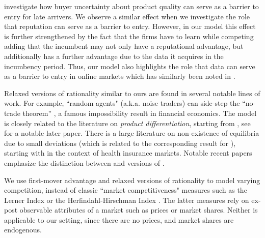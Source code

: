 \cite{schmalensee1982product, bagwell1990informational} investigate how buyer uncertainty about product quality can serve as a barrier to entry for late arrivers. We observe a similar effect when we investigate the role that reputation can serve as a barrier to entry. However, in our model this effect is further strengthened by the fact that the firms have to learn while competing adding that the incumbent may not only have a reputational advantage, but additionally has a further advantage due to the data it acquires in the incumbency period. Thus, our model also highlights the role that data can serve as a barrier to entry in online markets which has similarly been noted in \cite{de2020data}. 


Relaxed versions of rationality similar to ours are found in several notable lines of work. For example, ``random agents" (a.k.a. noise traders) can side-step the ``no-trade theorem'' \citep{Milgrom-Stokey-82}, a famous impossibility result in financial economics. The \SoftMaxRandom model is closely related to the literature on \emph{product differentiation}, starting from \cite{Hotelling-29}, see \cite{Perloff-Salop-85} for a notable later paper. There is a large literature on non-existence of equilibria due to small deviations   (which is related to the corresponding result for \HardMaxRandom), starting with \cite{Rothschild-Stiglitz-76} in the context of health insurance markets. Notable recent papers \citep{Veiga-Weyl-16,Azevedo-Gottlieb-17} emphasize the distinction between \HardMax and versions of \SoftMaxRandom.

We use first-mover advantage and relaxed versions of rationality to model varying competition, instead of classic ``market competitiveness" measures such as the Lerner Index or the Herfindahl-Hirschman Index
\citep{tirole1988theory}. The latter measures rely on ex-post observable attributes of a market such as prices or market shares. Neither is applicable to our setting, since there are no prices, and market shares are endogenous.








